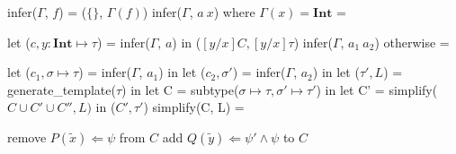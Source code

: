 \documentclass[runningheads]{llncs}
\newcommand \stypeint {\textbf{Int}}
\newcommand \typeint[1]{{#1} : \stypeint}
\newlength\myindent
\newcommand\bindent{%
  \begingroup
  \setlength{\itemindent}{\myindent}
  \addtolength{\algorithmicindent}{\myindent}
}
\newcommand\eindent{\endgroup}
\begin{document}
\begin{algorithmic}
\STATE infer($\Gamma$, $f$) = ($\{\}$, $\Gamma(f)$)
\STATE infer($\Gamma$, $a\ x$) where $\Gamma(x) = \stypeint$ =
    \bindent
    \STATE let ($c, \typeint{y} \mapsto \tau$) = infer($\Gamma$, $a$) in
    \STATE ($[y/x]C, [y/x]\tau$)
    \eindent
\STATE infer($\Gamma$, $a_1\ a_2$) otherwise =
    \bindent
    \STATE let ($c_1, \sigma \mapsto \tau$) = infer($\Gamma$, $a_1$) in
    \STATE let ($c_2, \sigma'$) = infer($\Gamma$, $a_2$) in
    \STATE let ($\tau', L$) = generate\_template($\tau$) in
    \STATE let C = subtype($\sigma \mapsto \tau, \sigma'\mapsto \tau'$) in
    \STATE let C' = simplify($ C \cup C' \cup C'', L)$ in
    \STATE ($ C', \tau'$)
    \eindent
\STATE simplify(C, L) =
    \bindent
            \STATE remove $P(\tilde{x}) \Leftarrow \psi$ from $C$
            \STATE add $Q(\tilde{y}) \Leftarrow \psi' \land \psi$ to $C$
        \ENDFOR
    \ENDWHILE
    \eindent

\end{algorithmic}
\end{document}
